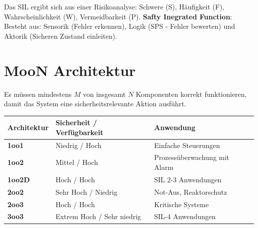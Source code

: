 \documentclass[9pt, landscape]{article}
\newcommand{\algo}[1]{\textbf{\textcolor{blue!60!black}{#1}}}
\begin{document}
\begin{multicols*}{4}
Das SIL ergibt sich aus einer Risikoanalyse: Schwere (S), Häufigkeit (F), Wahrscheinlichkeit (W), Vermeidbarkeit (P).
\algo{Safty Inegrated Function}: Besteht aus: Sensorik (Fehler erkennen), Logik (SPS - Fehler bewerten) und Aktorik (Sicheren Zustand einleiten).

\section{MooN Architektur}
Es müssen mindestens $M$ von insgesamt $N$ Komponenten korrekt funktionieren, damit das System eine
sicherheitsrelevante Aktion ausführt. 

\noindent
\begingroup
\setlength{\tabcolsep}{4pt}
\renewcommand{\cellalign}{l} %
\begin{tabularx}{\linewidth}{l >{\RaggedRight}X  >{\RaggedRight}X}
\toprule
\textbf{Architektur} &  \textbf{Sicherheit / Verfügbarkeit} & \textbf{Anwendung} \\
\midrule
\textbf{1oo1} &  Niedrig / Hoch & Einfache Steuerungen \\
\textbf{1oo2} & Mittel / Hoch & Prozessüberwachung mit Alarm \\ %
\textbf{1oo2D} & Hoch / Hoch & SIL 2-3 Anwendungen \\
\textbf{2oo2} & Sehr Hoch / Niedrig & Not-Aus, Reaktorschutz \\
\textbf{2oo3} & Hoch / Hoch & Kritische Systeme \\
\textbf{3oo3} & Extrem Hoch / Sehr niedrig & SIL-4 Anwendungen \\
\bottomrule
\end{tabularx}
\endgroup

\end{multicols*}
\end{document}
